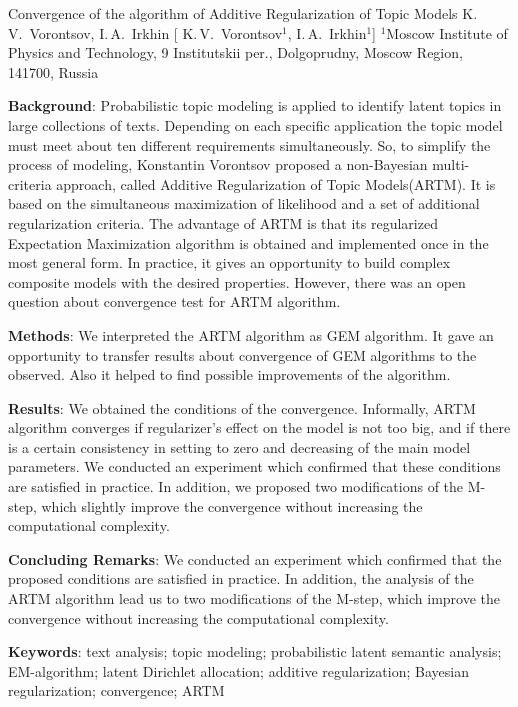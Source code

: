 \documentclass[12pt, twoside]{article}
\begin{document}
\titleEng
{Convergence of the algorithm of Additive Regularization of Topic Models}
\authorEng
    {K.\,V.~Vorontsov, I.\,A.~Irkhin}
    [ K.\,V.~Vorontsov$^{1}$, I.\,A.~Irkhin$^{1}$]
\organizationEng
    {$^1$Moscow Institute of Physics and Technology, 9 Institutskii per., Dolgoprudny, Moscow Region, 141700, Russia}
\abstractEng
    {
	\noindent
	\textbf{Background}: Probabilistic topic modeling is applied to identify latent topics in large collections of texts. Depending on each specific application the topic model must meet about ten different requirements simultaneously. So, to simplify the process of modeling, Konstantin Vorontsov proposed a non-Bayesian multi-criteria approach, called Additive Regularization of Topic Models(ARTM). It is based on the simultaneous maximization  of likelihood and a set of additional regularization criteria. The advantage of ARTM  is that its regularized Expectation Maximization algorithm is obtained and implemented once in the most general form. In practice, it gives an opportunity to build complex composite models with the desired properties. However, there was an open question about convergence test for ARTM algorithm.
	
	\noindent
	\textbf{Methods}: We interpreted the ARTM algorithm as GEM algorithm. It gave an opportunity to transfer results about convergence of GEM algorithms to the observed. Also it helped to find possible improvements of the algorithm.
	
	\noindent
	\textbf{Results}: We obtained the conditions of the convergence. Informally, ARTM algorithm converges if regularizer's effect on the model is not too big, and if there is a certain consistency in setting to zero and decreasing  of the main model parameters.  We conducted an experiment which confirmed that these conditions are satisfied in practice. In addition, we proposed two modifications of the M-step, which slightly improve the convergence without increasing the computational complexity.
	
	\noindent
	\textbf{Concluding Remarks}: We conducted an experiment which confirmed that the proposed conditions are satisfied in practice. In addition, the analysis of the ARTM algorithm lead us to two modifications of the M-step, which improve the convergence without increasing the computational complexity.
		
	\noindent
    	\textbf{Keywords}:  { text analysis; topic modeling; probabilistic latent semantic analysis; EM-algorithm; latent Dirichlet
allocation; additive regularization; Bayesian regularization; convergence; ARTM}
}
\end{document}
